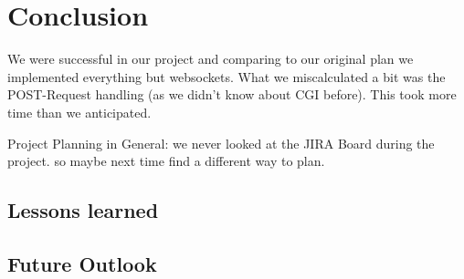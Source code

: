 \section*{Conclusion}
We were successful in our project and comparing to our original plan we implemented everything but websockets. 
What we miscalculated a bit was the POST-Request handling (as we didn't know about CGI before). This took more time than we anticipated. 

Project Planning in General: we never looked at the JIRA Board during the project. so maybe next time find a different way to plan.

\subsection*{Lessons learned}

\subsection*{Future Outlook}

